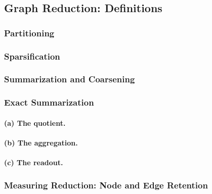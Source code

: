 \subsection{Graph Reduction: Definitions}
\label{sec:prelim:reduction}

\subsubsection{Partitioning}
\label{sec:prelim:reduction:partitioning}

\subsubsection{Sparsification}
\label{sec:prelim:reduction:sparsification}

\subsubsection{Summarization and Coarsening}
\label{sec:prelim:reduction:summarization}

\subsubsection{Exact Summarization}
\label{sec:prelim:reduction:exact}

\paragraph{(a) The quotient.}

\paragraph{(b) The aggregation.}

\paragraph{(c) The readout.}

\subsubsection{Measuring Reduction: Node and Edge Retention}
\label{sec:prelim:reduction:measuring}
